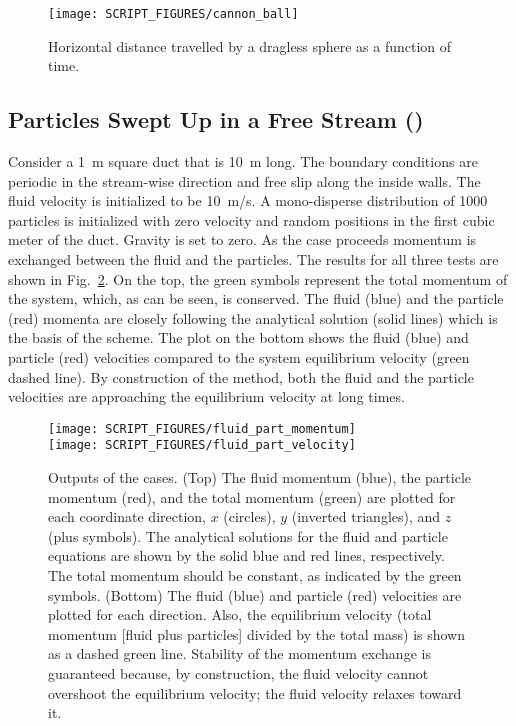 \documentclass[11pt]{book}
\begin{document}
\begin{figure}[!ht]
\centering
\texttt{[image: SCRIPT\_FIGURES/cannon\_ball]}
\caption[The  case]{Horizontal distance travelled by a dragless sphere as a function of time.}
\label{cannon_ball_fig}
\end{figure}


\subsection{Particles Swept Up in a Free Stream (\texorpdfstring{}{fluid\_part\_mom})}

Consider a 1~m square duct that is 10~m long.  The boundary conditions are periodic in the stream-wise direction and free slip along the inside walls. The fluid velocity is initialized to be 10~m/s. A mono-disperse distribution of 1000 particles is initialized with zero velocity and random positions in the first cubic meter of the duct. Gravity is set to zero. As the case proceeds momentum is exchanged between the fluid and the particles. The results for all three tests are shown in Fig.~\ref{fig_fluid_part_mom}.  On the top, the green symbols represent the total momentum of the system, which, as can be seen, is conserved.  The fluid (blue) and the particle (red) momenta are closely following the analytical solution (solid lines) which is the basis of the scheme.  The plot on the bottom shows the fluid (blue) and particle (red) velocities compared to the system equilibrium velocity (green dashed line).  By construction of the method, both the fluid and the particle velocities are approaching the equilibrium velocity at long times.

\begin{figure}[h]
\centering
\texttt{[image: SCRIPT\_FIGURES/fluid\_part\_momentum]}\\
\texttt{[image: SCRIPT\_FIGURES/fluid\_part\_velocity]}
\caption[Test of fluid-particle momentum transfer for non-stationary particles]{Outputs of the  cases.  (Top) The fluid momentum (blue), the particle momentum (red), and the total momentum (green) are plotted for each coordinate direction, $x$ (circles), $y$ (inverted triangles), and $z$ (plus symbols).  The analytical solutions for the fluid and particle equations are shown by the solid blue and red lines, respectively. The total momentum should be constant, as indicated by the green symbols. (Bottom) The fluid (blue) and particle (red) velocities are plotted for each direction.  Also, the equilibrium velocity (total momentum [fluid plus particles] divided by the total mass) is shown as a dashed green line.  Stability of the momentum exchange is guaranteed because, by construction, the fluid velocity cannot overshoot the equilibrium velocity; the fluid velocity relaxes toward it.}
\label{fig_fluid_part_mom}
\end{figure}
\end{document}
